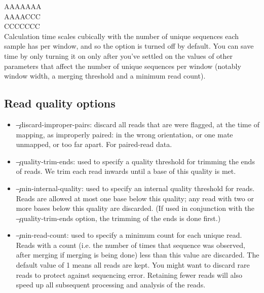 \begin{itemize}
AAAAAAA\\
AAAACCC\\
CCCCCCC\\
Calculation time scales cubically with the number of unique sequences each sample has per window, and so the option is turned off by default.
You can save time by only turning it on only after you've settled on the values of other parameters that affect the number of unique sequences per window (notably window width, a merging threshold and a minimum read count).
\end{itemize}

\subsection{Read quality options}
\begin{itemize}
\item \c{--discard-improper-pairs}: discard all reads that are were flagged, at the time of mapping, as improperly paired: in the wrong orientation, or one mate unmapped, or too far apart.
For paired-read data.
\item \c{--quality-trim-ends}: used to specify a quality threshold for trimming the ends of reads.
We trim each read inwards until a base of this quality is met.
\item \c{--min-internal-quality}: used to specify an internal quality threshold for reads.
Reads are allowed at most one base below this quality; any read with two or more bases below this quality are discarded.
(If used in conjunction with the \c{--quality-trim-ends option}, the trimming of the ends is done first.)
\item \c{--min-read-count}: used to specify a minimum count for each unique read.
Reads with a count (i.e. the number of times that sequence was observed, after merging if merging is being done) less than this value are discarded.
The default value of 1 means all reads are kept.
You might want to discard rare reads to protect against sequencing error.
Retaining fewer reads will also speed up all subsequent processing and analysis of the reads.
\end{itemize}


